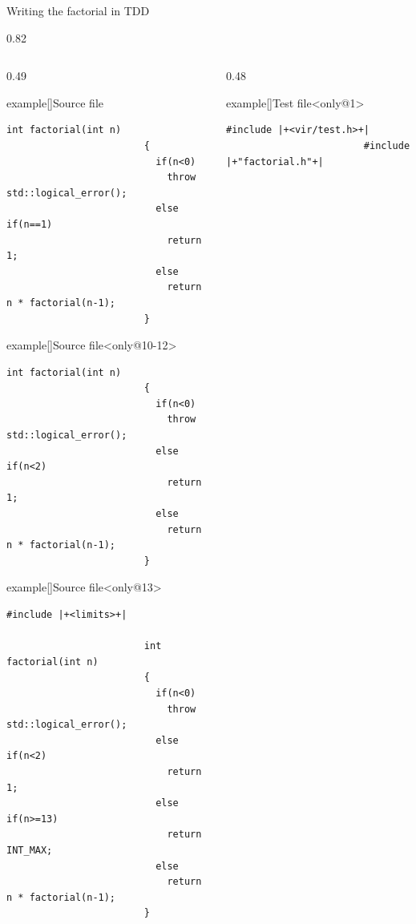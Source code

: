 \begin{frame}[fragile]{Writing the factorial in TDD}
\begin{overlayarea}{\textwidth}{0.82\textheight}
\begin{columns}[T]
\begin{column}{0.49\textwidth}
\begin{varblock}{example}[\textwidth]{Source file}
                    \begin{lstlisting}[style=MyCpp]
                        int factorial(int n)
                        {
                          if(n<0)
                            throw std::logical_error();
                          else if(n==1)
                            return 1;
                          else
                            return n * factorial(n-1);
                        }
                    \end{lstlisting}
                \end{varblock}
                \begin{varblock}{example}[\textwidth]{Source file}<only@10-12>
                    \begin{lstlisting}[style=MyCpp]
                        int factorial(int n)
                        {
                          if(n<0)
                            throw std::logical_error();
                          else if(n<2)
                            return 1;
                          else
                            return n * factorial(n-1);
                        }
                    \end{lstlisting}
                \end{varblock}
                \begin{varblock}{example}[\textwidth]{Source file}<only@13>
                    \begin{lstlisting}[style=MyCpp]
                        #include |+<limits>+|

                        int factorial(int n)
                        {
                          if(n<0)
                            throw std::logical_error();
                          else if(n<2)
                            return 1;
                          else if(n>=13)
                            return INT_MAX;
                          else
                            return n * factorial(n-1);
                        }
                    \end{lstlisting}
                \end{varblock}
            \end{column}
            \hspace*{-4mm}
            \begin{column}{0.48\textwidth}
                \begin{varblock}{example}[\textwidth]{Test file}<only@1>
                    \begin{lstlisting}[style=MyCpp, belowskip=-9mm]
                        #include |+<vir/test.h>+|
                        #include |+"factorial.h"+|


\end{lstlisting}
\end{varblock}
\end{column}
\end{columns}
\end{overlayarea}
\end{frame}
